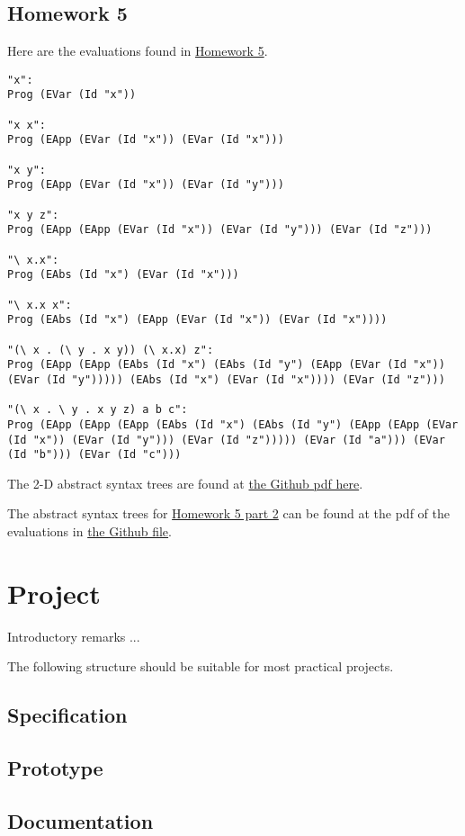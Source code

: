 \documentclass{article}
\theoremstyle{theorem}
\theoremstyle{definition}
\theoremstyle{remark}
\begin{document}
\subsection{Homework 5}
Here are the evaluations found in \href{https://hackmd.io/@alexhkurz/S1D0yP8Bw}{Homework 5}.
\begin{lstlisting}
"x":
Prog (EVar (Id "x"))

"x x":
Prog (EApp (EVar (Id "x")) (EVar (Id "x")))

"x y":
Prog (EApp (EVar (Id "x")) (EVar (Id "y")))

"x y z":
Prog (EApp (EApp (EVar (Id "x")) (EVar (Id "y"))) (EVar (Id "z")))

"\ x.x":
Prog (EAbs (Id "x") (EVar (Id "x")))

"\ x.x x":
Prog (EAbs (Id "x") (EApp (EVar (Id "x")) (EVar (Id "x"))))

"(\ x . (\ y . x y)) (\ x.x) z":
Prog (EApp (EApp (EAbs (Id "x") (EAbs (Id "y") (EApp (EVar (Id "x")) (EVar (Id "y"))))) (EAbs (Id "x") (EVar (Id "x")))) (EVar (Id "z")))

"(\ x . \ y . x y z) a b c":
Prog (EApp (EApp (EApp (EAbs (Id "x") (EAbs (Id "y") (EApp (EApp (EVar (Id "x")) (EVar (Id "y"))) (EVar (Id "z"))))) (EVar (Id "a"))) (EVar (Id "b"))) (EVar (Id "c")))
\end{lstlisting}

\noindent The 2-D abstract syntax trees are found at \href{}{the Github pdf here}.

\noindent The abstract syntax trees for \href{https://hackmd.io/@alexhkurz/H1e4Nv8Bv}{Homework 5 part 2} can be found at the pdf of the evaluations in \href{https://github.com/dapak2002/Pak-D-CPSC-354-Report/blob/main/src/Hw5-pt2.pdf}{the Github file}.

\section{Project}

Introductory remarks ...

The following structure should be suitable for most practical projects. 

\subsection{Specification}
\subsection{Prototype}
\subsection{Documentation}
\end{document}
